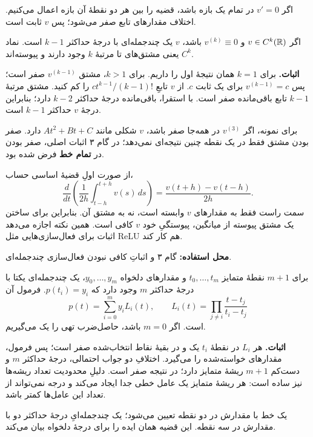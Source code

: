 اگر $v'=0$ در تمام یک بازه باشد، قضیه را بین هر دو نقطهٔ آن بازه اعمال می‌کنیم. اختلاف مقدارهای تابع صفر می‌شود؛ پس $v$ ثابت است.

اگر $v\in C^k(\R)$ و $v^{(k)}\equiv0$ باشد، $v$ یک چندجمله‌ای با درجهٔ حداکثر $k-1$ است. نماد $C^k$ یعنی مشتق‌های تا مرتبهٔ $k$ وجود دارند و پیوسته‌اند.

\textbf{اثبات.} برای $k=1$ همان نتیجهٔ اول را داریم. برای $k>1$، مشتق $v^{(k-1)}$ صفر است؛ پس $v^{(k-1)}=c$ برای یک ثابت $c$. از $v$ تابعِ $ct^{k-1}/(k-1)!$ را کم کنید. مشتق مرتبهٔ $k-1$ تابع باقی‌مانده صفر است. با استقرا، باقی‌مانده درجهٔ حداکثر $k-2$ دارد؛ بنابراین درجهٔ $v$ حداکثر $k-1$ است.

\begin{intuition}
برای نمونه، اگر $v^{(3)}$ در همه‌جا صفر باشد، $v$ شکلی مانند $At^2+Bt+C$ دارد. صفر بودن مشتق فقط در یک نقطه چنین نتیجه‌ای نمی‌دهد؛ در گام ۳ اثبات اصلی، صفر بودن در \textbf{تمام خط} فرض شده بود.
\end{intuition}

از صورت اولِ قضیهٔ اساسی حساب،
\[
\frac{d}{dt}\left(\frac1{2h}\int_{t-h}^{t+h}v(s)\,ds\right)
=\frac{v(t+h)-v(t-h)}{2h}.
\]
سمت راست فقط به مقدارهای $v$ وابسته است، نه به مشتق آن. بنابراین برای ساختن یک مشتق پیوسته از میانگین، پیوستگیِ خود $v$ کافی است. همین نکته اجازه می‌دهد اثبات برای فعال‌سازی‌هایی مثل ReLU هم کار کند.

\textbf{محل استفاده:} گام ۳ و اثباتِ کافی نبودن فعال‌سازی چندجمله‌ای.

برای $m+1$ نقطهٔ متمایز $t_0,\ldots,t_m$ و مقدارهای دلخواه $y_0,\ldots,y_m$، یک چندجمله‌ای یکتا با درجهٔ حداکثر $m$ وجود دارد که $p(t_i)=y_i$. فرمول آن
\[
p(t)=\sum_{i=0}^{m}y_i L_i(t),
\qquad L_i(t)=\prod_{j\neq i}\frac{t-t_j}{t_i-t_j}
\]
است. اگر $m=0$ باشد، حاصل‌ضرب تهی را یک می‌گیریم.

\textbf{اثبات.} هر $L_i$ در نقطهٔ $t_i$ یک و در بقیهٔ نقاط انتخاب‌شده صفر است؛ پس فرمول، مقدارهای خواسته‌شده را می‌گیرد. اختلافِ دو جواب احتمالی، درجهٔ حداکثر $m$ و دست‌کم $m+1$ ریشهٔ متمایز دارد؛ در نتیجه صفر است. دلیلِ محدودیت تعداد ریشه‌ها نیز ساده است: هر ریشهٔ متمایز یک عامل خطی جدا ایجاد می‌کند و درجه نمی‌تواند از تعداد این عامل‌ها کمتر باشد.

\begin{intuition}
یک خط با مقدارش در دو نقطه تعیین می‌شود؛ یک چندجمله‌ایِ درجهٔ حداکثر دو با مقدارش در سه نقطه. این قضیه همان ایده را برای درجهٔ دلخواه بیان می‌کند.
\end{intuition}

